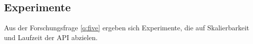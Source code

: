 \subsection{Experimente} \label{sec:Experimente}
    Aus der Forschungsfrage \ref{q:five} ergeben sich Experimente, die auf Skalierbarkeit und Laufzeit der API abzielen.
    
    
    
